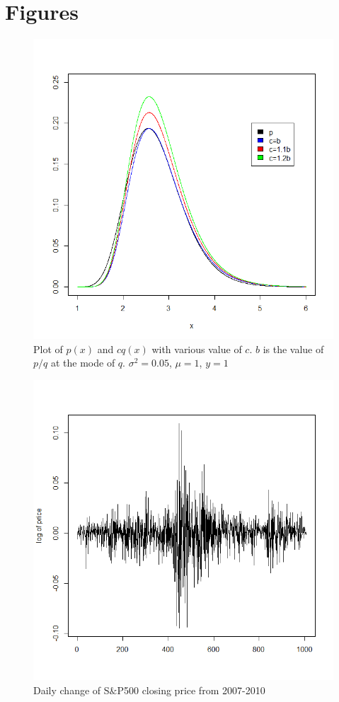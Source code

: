 \documentclass{article}
\begin{document}
\section{Figures}
\begin{figure}[H]
\centering
\includegraphics[scale=0.3]{pq}
\caption{Plot of $p(x)$ and $cq(x)$ with various value of $c$. $b$ is the value of $p/q$ at the mode of $q$. $\sigma^2=0.05$, $\mu=1$, $y=1$}\label{12}
\end{figure}
\begin{figure}[H]
\centering
\includegraphics[scale=0.3]{sp}
\caption{Daily change of S$\&$P500 closing price from 2007-2010}\label{9}
\end{figure}
\end{document}
